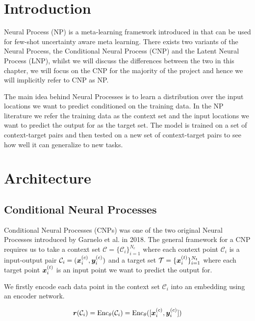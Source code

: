 \documentclass[../../main.tex]{subfiles}
\begin{document}
\section{Introduction}

Neural Process (NP) is a meta-learning framework introduced in \cite{garnelo2018conditional, garnelo2018neural} that can be used for few-shot uncertainty aware meta learning. There exists two variants of the Neural Process, the Conditional Neural Process (CNP) and the Latent Neural Process (LNP), whilst we will discuss the differences between the two in this chapter, we will focus on the CNP for the majority of the project and hence we will implicitly refer to CNP as NP. 

The main idea behind Neural Processes is to learn a distribution over the input locations we want to predict conditioned on the training data. In the NP literature we refer the training data as the context set and the input locations we want to predict the output for as the target set. The model is trained on a set of context-target pairs and then tested on a new set of context-target pairs to see how well it can generalize to new tasks.

\section{Architecture}

\subsection{Conditional Neural Processes}

Conditional Neural Processes (CNPs) \cite{garnelo2018conditional} was one of the two original Neural Processes introduced by Garnelo et al. in 2018. The general framework for a CNP requires us to take a context set $\mathcal{C} = \{ \mathcal{C}_i \}_{i=1}^{N_c}$ where each context point $\mathcal{C}_i$ is a input-output pair $\mathcal{C}_i = (\bm{x}_{i}^{(c)}, \bm{y}_i^{(c)}) $ and a target set $\mathcal{T} = \{ \bm{x}_{i}^{(t)} \}_{i=1}^{N_t}$ where each target point $\bm{x}_{i}^{(t)}$ is an input point we want to predict the output for.

We firstly encode each data point in the context set $\mathcal{C}_i$ into an embedding using an encoder network.


\begin{equation}
    \bm{r}(\mathcal{C}_i) = \text{Enc}_\theta(\mathcal{C}_i) = \text{Enc}_\theta( [\bm{x}_{i}^{(c)}, \bm{y}_i^{(c)}] )
\end{equation}
\end{document}
